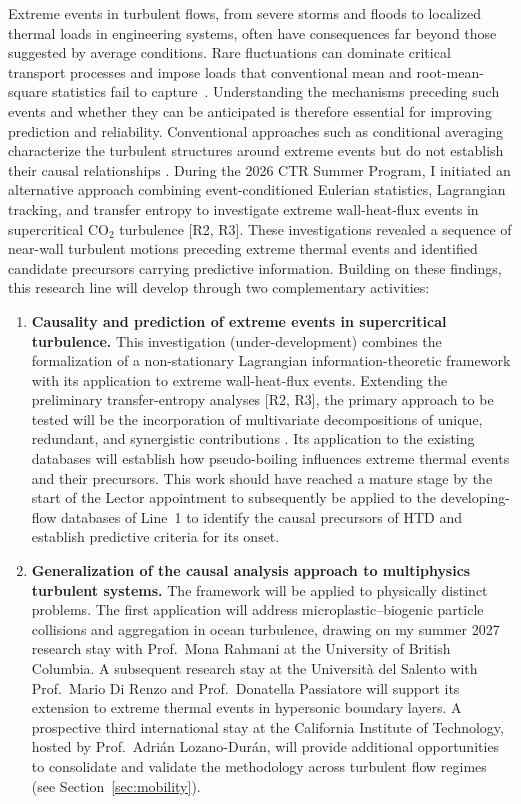 \documentclass[11pt]{article}
\begin{document}
Extreme events in turbulent flows, from severe storms and floods to localized thermal loads in engineering systems, often have consequences far beyond those suggested by average conditions.
Rare fluctuations can dominate critical transport processes and impose loads that conventional mean and root-mean-square statistics fail to capture~\cite{Guerrero2020}.
Understanding the mechanisms preceding such events and whether they can be anticipated is therefore essential for improving prediction and reliability.
Conventional approaches such as conditional averaging characterize the turbulent structures around extreme events but do not establish their causal relationships \cite{Hack2021,Zhang2023}.
During the 2026 CTR Summer Program, I initiated an alternative approach combining event-conditioned Eulerian statistics, Lagrangian tracking, and transfer entropy to investigate extreme wall-heat-flux events in supercritical CO$_2$ turbulence [R2, R3].
These investigations revealed a sequence of near-wall turbulent motions preceding extreme thermal events and identified candidate precursors carrying predictive information.
Building on these findings, this research line will develop through two complementary activities:
\begin{enumerate}
	\item \textbf{Causality and prediction of extreme events in supercritical turbulence.}
	This investigation (under-development) combines the formalization of a non-stationary Lagrangian information-theoretic framework with its application to extreme wall-heat-flux events.
	Extending the preliminary transfer-entropy analyses [R2, R3], the primary approach to be tested will be the incorporation of multivariate decompositions of unique, redundant, and synergistic contributions \cite{MartinezSanchez2024}.
	Its application to the existing databases will establish how pseudo-boiling influences extreme thermal events and their precursors.
	This work should have reached a mature stage by the start of the Lector appointment to subsequently be applied to the developing-flow databases of Line~1 to identify the causal precursors of HTD and establish predictive criteria for its onset.
	
	\item \textbf{Generalization of the causal analysis approach to multiphysics turbulent systems.}
	The framework will be applied to physically distinct problems.
	The first application will address microplastic--biogenic particle collisions and aggregation in ocean turbulence, drawing on my summer 2027 research stay with Prof.~Mona Rahmani at the University of British Columbia.
	A subsequent research stay at the Universit\`a del Salento with Prof.~Mario Di Renzo and Prof.~Donatella Passiatore will support its extension to extreme thermal events in hypersonic boundary layers.
	A prospective third international stay at the California Institute of Technology, hosted by Prof.~Adrián Lozano-Durán, will provide additional opportunities to consolidate and validate the methodology across turbulent flow regimes (see Section~\ref{sec:mobility}).
\end{enumerate}
\end{document}
